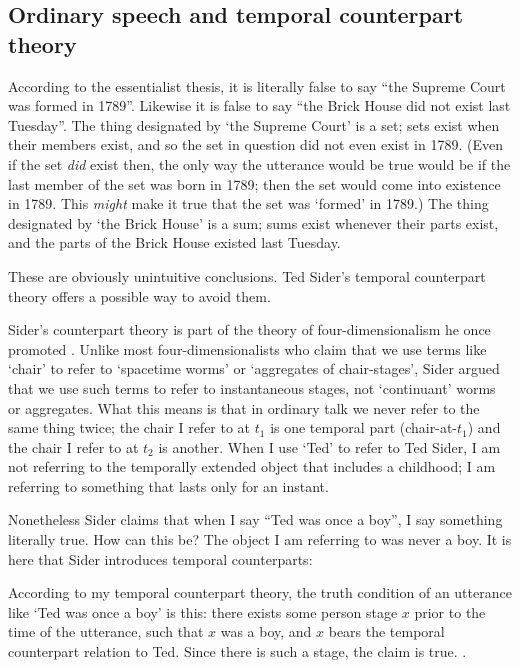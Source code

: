 \documentclass[11pt]{article}
\newenvironment{squote}{%
\begin{spacing}{1}
\begin{list}{}{%
\setlength{\labelwidth}{0pt}%
\rightmargin\leftmargin%
}
\item\relax
}{%
\end{list}%
\end{spacing}
}
\begin{document}
\begin{spacing}{1.5}
\subsection{Ordinary speech and temporal counterpart theory}
\label{counterpart}
According to the essentialist thesis, it is literally false to say
``the Supreme Court was formed in 1789''.  Likewise it is false to say
``the Brick House did not exist last Tuesday''.  The thing designated
by `the Supreme Court' is a set; sets exist when their members exist,
and so the set in question did not even exist in 1789.  (Even if the
set {\em did} exist then, the only way the utterance would be true
would be if the last member of the set was born in 1789; then the set
would come into existence in 1789.  This {\em might} make it true that
the set was `formed' in 1789.)  The thing designated by `the Brick
House' is a sum; sums exist whenever their parts exist, and the parts
of the Brick House existed last Tuesday.

These are obviously unintuitive conclusions.  Ted Sider's temporal
counterpart theory offers a possible way to avoid them.

Sider's counterpart theory is part of the theory of
four-dimensionalism he once promoted \citeyearpar{sider2001}.  Unlike
most four-dimensionalists who claim that we use terms like `chair' to
refer to `spacetime worms' or `aggregates of chair-stages', Sider
argued that we use such terms to refer to instantaneous stages, not
`continuant' worms or aggregates.  What this means is that in ordinary
talk we never refer to the same thing twice; the chair I refer to at
$t_1$ is one temporal part (chair-at-$t_1$) and the chair I refer to
at $t_2$ is another.  When I use `Ted' to refer to Ted Sider, I am not
referring to the temporally extended object that includes a childhood;
I am referring to something that lasts only for an instant.

Nonetheless Sider claims that when I say ``Ted was once a boy'', I say
something literally true.  How can this be?  The object I am referring
to was never a boy.  It is here that Sider introduces temporal
counterparts:

\begin{squote}
According to my temporal counterpart theory, the truth condition of an
utterance like `Ted was once a boy' is this: there exists some person
stage $x$ prior to the time of the utterance, such that $x$ was a boy,
and $x$ bears the temporal counterpart relation to Ted.  Since there
is such a stage, the claim is true. \citeyearpar[193]{sider2001}.
\end{squote}


\end{spacing}
\end{document}

